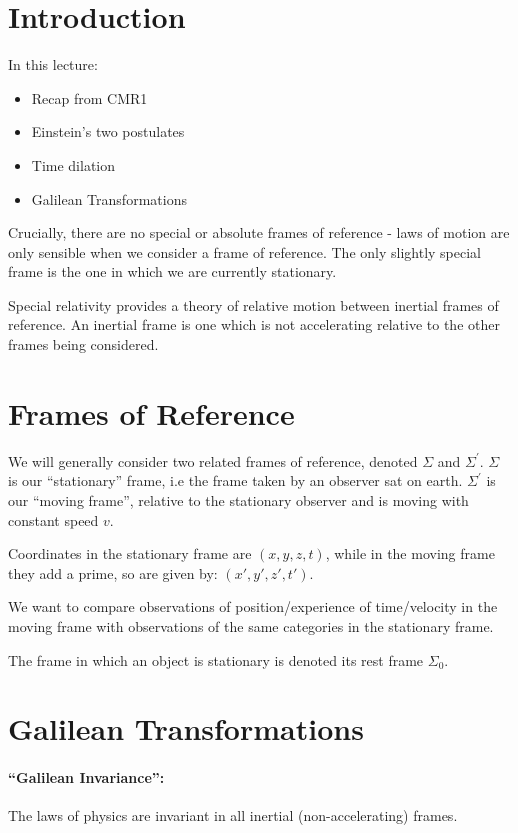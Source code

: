 
\section{Introduction}
In this lecture:
\begin{itemize}
    \item Recap from CMR1
    \item Einstein's two postulates
    \item Time dilation
    \item Galilean Transformations
\end{itemize}

Crucially, there are no special or absolute frames of reference - laws of motion are only sensible when we consider a frame of reference. The only slightly special frame is the one in which we are currently stationary.

Special relativity provides a theory of relative motion between inertial frames of reference. An inertial frame is one which is not accelerating relative to the other frames being considered.

\section{Frames of Reference}

We will generally consider two related frames of reference, denoted $\Sigma$ and $\Sigma^\prime$. $\Sigma$ is our ``stationary'' frame, i.e the frame taken by an observer sat on earth. $\Sigma^\prime$ is our ``moving frame'', relative to the stationary observer and is moving with constant speed $v$.

Coordinates in the stationary frame are $(x, y, z, t)$, while in the moving frame they add a prime, so are given by: $(x', y', z', t')$.

We want to compare observations of position/experience of time/velocity in the moving frame with observations of the same categories in the stationary frame.

The frame in which an object is stationary is denoted its rest frame $\Sigma_0$.

\section{Galilean Transformations}
\paragraph{``Galilean Invariance'':} The laws of physics are invariant in all inertial (non-accelerating) frames.

